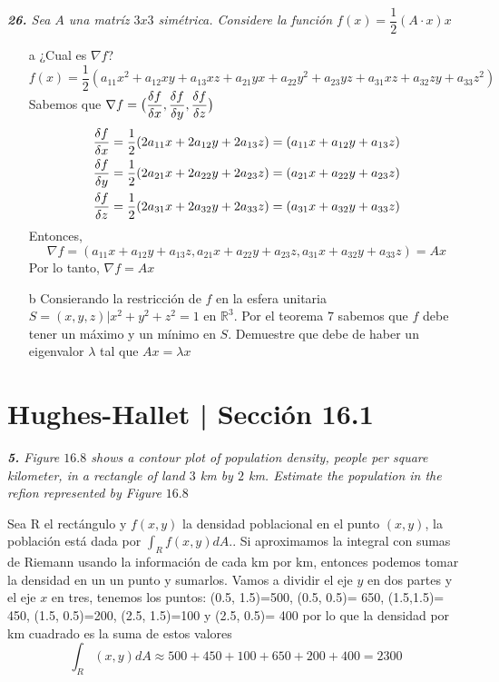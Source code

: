 \documentclass[a4paper,12pt]{article}
\begin{document}
\textit{\textbf{26.} Sea $A$ una matríz $3x3$ simétrica. Considere la función $f(x)=\dfrac{1}{2}(A\cdot x)x$}
\begin{itemize}
	\item[a] ¿Cual es $\nabla f$?\\
	$$f(x) = \dfrac{1}{2}(a_{11}x^2+a_{12}xy+a_{13}xz+a_{21}yx+a_{22}y^2+a_{23}yz+a_{31}xz+a_{32}zy+a_{33}z^2)$$
	Sabemos que $\nabla f = \big(\dfrac{\delta f}{\delta x},\dfrac{\delta f}{\delta y},\dfrac{\delta f}{\delta z}\big)$
	\begin{align}
		\dfrac{\delta f}{\delta x}&=\dfrac{1}{2}(2a_{11}x+2a_{12}y+2a_{13}z)=(a_{11}x+a_{12}y+a_{13}z)\\
		\dfrac{\delta f}{\delta y}&=\dfrac{1}{2}(2a_{21}x+2a_{22}y+2a_{23}z)=(a_{21}x+a_{22}y+a_{23}z)\\
		\dfrac{\delta f}{\delta z}&=\dfrac{1}{2}(2a_{31}x+2a_{32}y+2a_{33}z)=(a_{31}x+a_{32}y+a_{33}z)
	\end{align}
	Entonces, $$\nabla f =(a_{11}x+a_{12}y+a_{13}z,a_{21}x+a_{22}y+a_{23}z,a_{31}x+a_{32}y+a_{33}z)=Ax$$
	Por lo tanto, $\nabla f = Ax$
	\item[b] Consierando la restricción de $f$ en la esfera unitaria $S={(x, y, z)|x^2 + y^2 + z^2 = 1}$ en $\mathbb{R}^3$. Por el teorema $7$ sabemos que $f$ debe tener un máximo y un mínimo en $S$. Demuestre que debe de haber un eigenvalor $\lambda$ tal que $Ax = \lambda x$
\end{itemize}
	\section{Hughes-Hallet | Sección 16.1}
	\textit{\textbf{5.} Figure $16.8$ shows a contour plot of population density, people per square kilometer, in a rectangle of land $3$ km by $2$ km. Estimate the population in the refion represented by Figure $16.8$}

Sea R el rectángulo y $f(x,y)$ la densidad poblacional en el punto $(x,y)$, la población está dada por $\int_{R}f(x,y)dA$.. Si aproximamos la integral con sumas de Riemann usando la información de cada km por km, entonces podemos tomar la densidad en un un punto y sumarlos.
Vamos a dividir el eje $y$ en dos partes y el eje $x$ en tres, tenemos los puntos:
(0.5, 1.5)=500, (0.5, 0.5)= 650, (1.5,1.5)= 450, (1.5, 0.5)=200, (2.5, 1.5)=100 y (2.5, 0.5)= 400
por lo que la densidad por km cuadrado es la suma de estos valores
\[\int_{R}(x,y)dA\approx 500 + 450 + 100 + 650 + 200 + 400 = 2300\]
\end{document}
